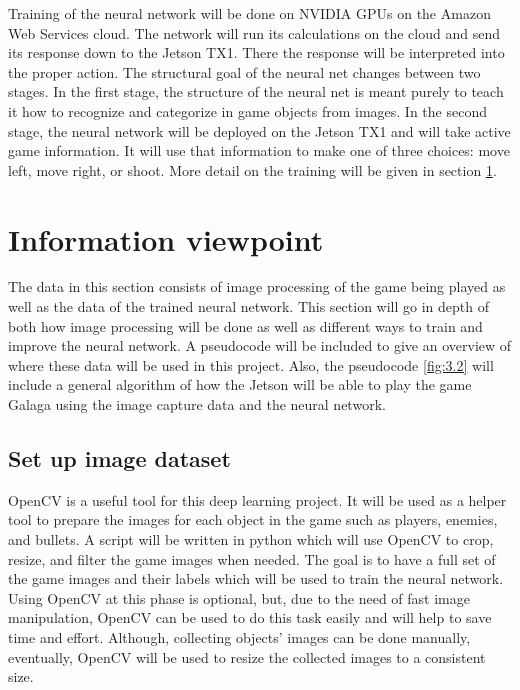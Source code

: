 \documentclass{onecolumn, draftclsnofoot,10pt, compsoc}[IEEEtran
\begin{document}
\newline
\newline
Training of the neural network will be done on NVIDIA GPUs on the Amazon Web Services cloud.
The network will run its calculations on the cloud and send its response down to the Jetson TX1.
There the response will be interpreted into the proper action.
\newline
\newline
The structural goal of the neural net changes between two stages.
In the first stage, the structure of the neural net is meant purely to teach it how to recognize and categorize in game objects from images.
In the second stage, the neural network will be deployed on the Jetson TX1 and will take active game information.
It will use that information to make one of three choices: move left, move right, or shoot.
More detail on the training will be given in section \ref{sssec:num2}.

\section{Information viewpoint}\label{sssec:num2}%

The data in this section consists of image processing of the game being played as well as the data of the trained neural network.
This section will go in depth of both how image processing will be done as well as different ways to train and improve the neural network.
A pseudocode will be included to give an overview of where these data will be used in this project.
Also, the pseudocode \ref{fig:3.2} will include a general algorithm of how the Jetson will be able to play the game Galaga using the image capture data and the neural network.

\subsection{Set up image dataset}%

OpenCV is a useful tool for this deep learning project.
It will be used as a helper tool to prepare the images for each object in the game such as players, enemies, and bullets.
A script will be written in python which will use OpenCV to crop, resize, and filter the game images when needed.
The goal is to have a full set of the game images and their labels which will be used to train the neural network.
Using OpenCV at this phase is optional, but, due to the need of fast image manipulation, OpenCV can be used to do this task easily and will help to save time and effort.
Although, collecting objects’ images can be done manually, eventually, OpenCV will be used to resize the collected images to a consistent size.
\end{document}
